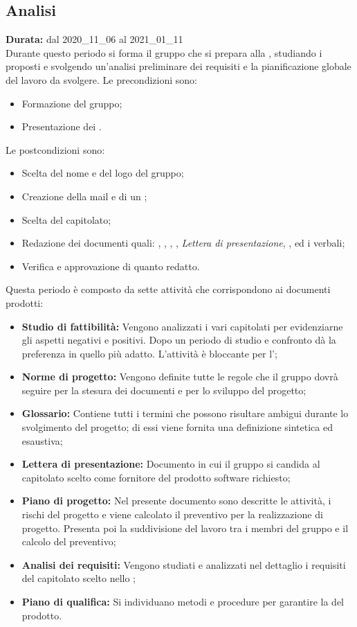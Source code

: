 \subsection{Analisi}
\label{analisi}
\textbf{Durata:} dal 2020\_11\_06 al 2021\_01\_11\\
Durante questo periodo si forma il gruppo che si prepara alla , studiando i  proposti e svolgendo un'analisi preliminare dei requisiti e la pianificazione globale del lavoro da svolgere. 
Le precondizioni sono:
\begin{itemize}
    \item Formazione del gruppo;
    \item Presentazione dei .
\end{itemize}
Le postcondizioni sono:
\begin{itemize}
    \item Scelta del nome e del logo del gruppo;
    \item Creazione della mail e di un  ;
    \item Scelta del capitolato;
    \item Redazione dei documenti quali: {\SdF}, {\NdP}, {\PdP}, {\Glossario}, \textit{Lettera di presentazione}, {\PdQ}, {\AdR} ed i verbali;
    \item Verifica e approvazione di quanto redatto.
\end{itemize}
Questa periodo è composto da sette attività che corrispondono ai documenti prodotti:
\begin{itemize}
    \item \textbf{Studio di fattibilità:} Vengono analizzati i vari capitolati per evidenziarne gli aspetti negativi e positivi. Dopo un periodo di studio e confronto {\Gruppo} dà la preferenza in quello più adatto. L'attività è bloccante per l'{\AdR};
    \item \textbf{Norme di progetto:} Vengono definite tutte le regole che il gruppo {\Gruppo} dovrà seguire per la stesura dei documenti e per lo sviluppo del progetto;
    \item \textbf{Glossario:} Contiene tutti i termini che possono risultare ambigui durante lo svolgimento del progetto; di essi viene fornita una definizione sintetica ed esaustiva;
    \item \textbf{Lettera di presentazione:} Documento in cui il gruppo {\Gruppo} si candida al capitolato scelto come fornitore del prodotto software richiesto;
    \item \textbf{Piano di progetto:} Nel presente documento sono descritte le attività, i rischi del progetto e viene calcolato il preventivo per la realizzazione di progetto. Presenta poi la suddivisione del lavoro tra i membri del gruppo {\Gruppo} e il calcolo del preventivo;
    \item \textbf{Analisi dei requisiti:} Vengono studiati e analizzati nel dettaglio i requisiti del capitolato scelto nello {\SdF};
    \item \textbf{Piano di qualifica:} Si individuano metodi e procedure per garantire la  del prodotto.
\end{itemize}
